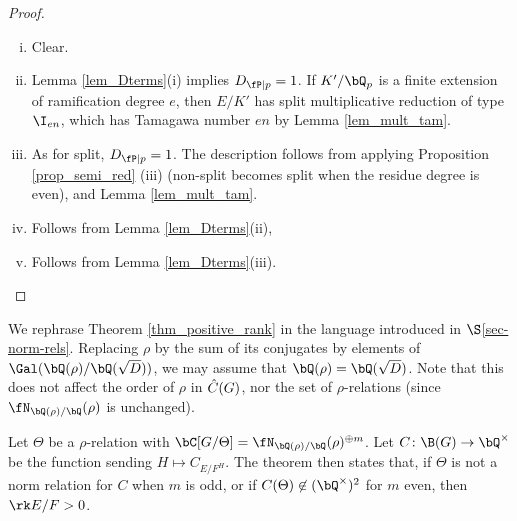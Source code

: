 \begin{proof}
    \
    \begin{enumerate}[(i)]
        \setlength\itemsep{0em}
        \item Clear. 
        \item Lemma \ref{lem_Dterms}(i) implies $D_{\fP \mid p} = 1$. If $K' / \bQ_p$ is a finite extension of ramification degree $e$, then $E / K'$ has split multiplicative reduction of type $\I_{en}$, which has Tamagawa number $en$ by Lemma \ref{lem_mult_tam}.
        \item As for split, $D_{\fP \mid p} = 1$. The description follows from applying Proposition \ref{prop_semi_red} (iii) (non-split becomes split when the residue degree is even), and Lemma \ref{lem_mult_tam}. 
        \item Follows from Lemma \ref{lem_Dterms}(ii),
        \item Follows from Lemma \ref{lem_Dterms}(iii).
    \end{enumerate}
\end{proof}

\begin{rem}\label{rephrase-thm}
    We rephrase Theorem \ref{thm_positive_rank} in the language introduced in $\S$\ref{sec-norm-rels}. 
    Replacing $\rho$ by the sum of its conjugates by elements of $ \Gal(\bQ(\rho) / \bQ(\sqrt{D}))$, we may assume that $\bQ(\rho) = \bQ(\sqrt{D})$. Note that this does not affect the order of $\rho$ in $\hat{C}(G)$, nor the set of $\rho$-relations (since $\repnorm{\rho}$ is unchanged). 
    
    Let $\Theta$ be a $\rho$-relation with $\bC[G / \Theta] = \repnorm{\rho}^{\oplus m}$. Let $C \colon \B(G) \to \bQ^{\times}$ be the function sending $H \mapsto C_{E / F^H}$. The theorem then states that, if $\Theta$ is not a norm relation for $C$ when $m$ is odd, or if $C(\Theta) \not\in (\bQ^{\times})^2$ for $m$ even, then $ \rk E / F > 0$. 
\end{rem}